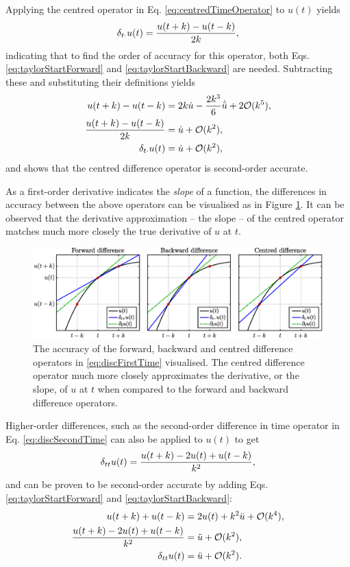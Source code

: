 Applying the centred operator in Eq. \eqref{eq:centredTimeOperator} to $u(t)$ yields
\begin{equation}
    \delta_{t\cdot} u(t) = \frac{u(t+k) - u(t-k)}{2k},
\end{equation}
indicating that to find the order of accuracy for this operator, both Eqs. \eqref{eq:taylorStartForward} and \eqref{eq:taylorStartBackward} are needed. Subtracting these and substituting their definitions yields
\begin{align}
    u(t+k) - u(t-k) &= 2k\dot u - \frac{2k^3}{6}\dot{\ddot{u}} + 2\mathcal{O}(k^5),\nonumber\\
    \frac{u(t+k) - u(t-k)}{2k} &= \dot u + \mathcal{O}(k^2),\nonumber\\
    \delta_{t\cdot} u(t) &= \dot u + \mathcal{O}(k^2),
\end{align}
and shows that the centred difference operator is second-order accurate. 

As a first-order derivative indicates the \textit{slope} of a function, the differences in accuracy between the above operators can be visualised as in Figure \ref{fig:taylor}. It can be observed that the derivative approximation -- the slope -- of the centred operator matches much more closely the true derivative of $u$ at $t$.

\begin{figure}[t]
    \includegraphics[width=\textwidth]{figures/fdtd/taylor.eps}
    \caption{\label{fig:taylor} The accuracy of the forward, backward and centred difference operators in \eqref{eq:discFirstTime} visualised. The centred difference operator much more closely approximates the derivative, or the slope, of $u$ at $t$ when compared to the forward and backward difference operators.}
\end{figure}

Higher-order differences, such as the second-order difference in time operator in Eq. \eqref{eq:discSecondTime} can also be applied to $u(t)$ to get
\begin{equation}
    \delta_{tt} u(t) =  \frac{u(t+k) - 2u(t) + u(t-k)}{k^2},
\end{equation}
and can be proven to be second-order accurate by adding Eqs. \eqref{eq:taylorStartForward} and \eqref{eq:taylorStartBackward}:
\begin{align}
    u(t+k) + u(t-k) &= 2 u(t) + k^2 \ddot u + \mathcal{O}(k^4),\nonumber\\
    \frac{u(t+k) -2 u(t) + u(t-k)}{k^2} &= \ddot u + \mathcal{O}(k^2),\nonumber\\
    \delta_{tt} u(t) &= \ddot u + \mathcal{O}(k^2).
\end{align}

